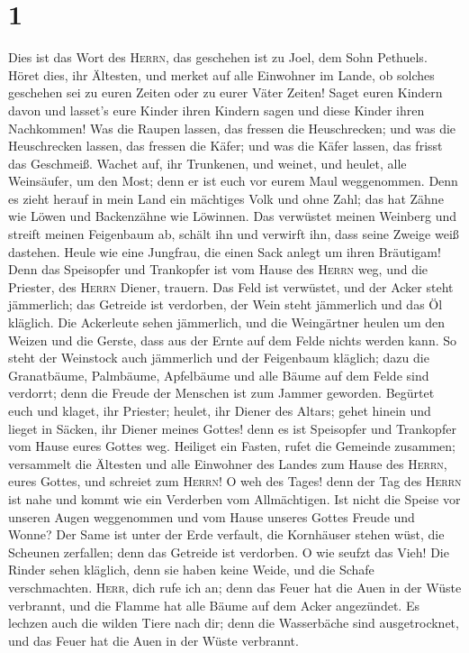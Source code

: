 \hypertarget{section}{%
\section{1}\label{section}}

 Dies ist das Wort des \textsc{Herrn}, das geschehen ist
zu Joel, dem Sohn Pethuels.  Höret dies, ihr Ältesten, und
merket auf alle Einwohner im Lande, ob solches geschehen sei zu euren
Zeiten oder zu eurer Väter Zeiten!  Saget euren Kindern
davon und lasset's eure Kinder ihren Kindern sagen und diese Kinder
ihren Nachkommen!  Was die Raupen lassen, das fressen die
Heuschrecken; und was die Heuschrecken lassen, das fressen die Käfer;
und was die Käfer lassen, das frisst das Geschmeiß. 
Wachet auf, ihr Trunkenen, und weinet, und heulet, alle Weinsäufer, um
den Most; denn er ist euch vor eurem Maul weggenommen. 
Denn es zieht herauf in mein Land ein mächtiges Volk und ohne Zahl; das
hat Zähne wie Löwen und Backenzähne wie Löwinnen.  Das
verwüstet meinen Weinberg und streift meinen Feigenbaum ab, schält ihn
und verwirft ihn, dass seine Zweige weiß dastehen.  Heule
wie eine Jungfrau, die einen Sack anlegt um ihren Bräutigam!
 Denn das Speisopfer und Trankopfer ist vom Hause des
\textsc{Herrn} weg, und die Priester, des \textsc{Herrn} Diener,
trauern.  Das Feld ist verwüstet, und der Acker steht
jämmerlich; das Getreide ist verdorben, der Wein steht jämmerlich und
das Öl kläglich.  Die Ackerleute sehen jämmerlich, und
die Weingärtner heulen um den Weizen und die Gerste, dass aus der Ernte
auf dem Felde nichts werden kann.  So steht der Weinstock
auch jämmerlich und der Feigenbaum kläglich; dazu die Granatbäume,
Palmbäume, Apfelbäume und alle Bäume auf dem Felde sind verdorrt; denn
die Freude der Menschen ist zum Jammer geworden. 
Begürtet euch und klaget, ihr Priester; heulet, ihr Diener des Altars;
gehet hinein und lieget in Säcken, ihr Diener meines Gottes! denn es ist
Speisopfer und Trankopfer vom Hause eures Gottes weg. 
Heiliget ein Fasten, rufet die Gemeinde zusammen; versammelt die
Ältesten und alle Einwohner des Landes zum Hause des \textsc{Herrn},
eures Gottes, und schreiet zum \textsc{Herrn}!  O weh des
Tages! denn der Tag des \textsc{Herrn} ist nahe und kommt wie ein
Verderben vom Allmächtigen.  Ist nicht die Speise vor
unseren Augen weggenommen und vom Hause unseres Gottes Freude und Wonne?
 Der Same ist unter der Erde verfault, die Kornhäuser
stehen wüst, die Scheunen zerfallen; denn das Getreide ist verdorben.
 O wie seufzt das Vieh! Die Rinder sehen kläglich, denn
sie haben keine Weide, und die Schafe verschmachten. 
\textsc{Herr}, dich rufe ich an; denn das Feuer hat die Auen in der
Wüste verbrannt, und die Flamme hat alle Bäume auf dem Acker angezündet.
 Es lechzen auch die wilden Tiere nach dir; denn die
Wasserbäche sind ausgetrocknet, und das Feuer hat die Auen in der Wüste
verbrannt.

